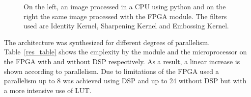 \documentclass[conference,compsoc]{IEEEtran}
\begin{document}
\begin{figure}[!t]
\centering
{}
\hfil
{}
\hfil
{}
\caption{On the left, an image processed in a CPU using python and on the right the
  same image processed with the FPGA module. The filters used are \protect{}
  Identity Kernel, \protect{} Sharpening Kernel and \protect{} Embossing Kernel.}
\label{images_py_po}
\end{figure}

The architecture was synthesized for different degrees of parallelism.
Table~\ref{res_table} shows the cmplexity by the module and the microprocessor
on the FPGA with and without DSP respectively. As a result, a linear increase is
shown according to parallelism. Due to limitations of the FPGA used a
parallelism up to 8 was achieved using DSP and up to 24 without DSP but with a
more intensive use of LUT.
\end{document}
